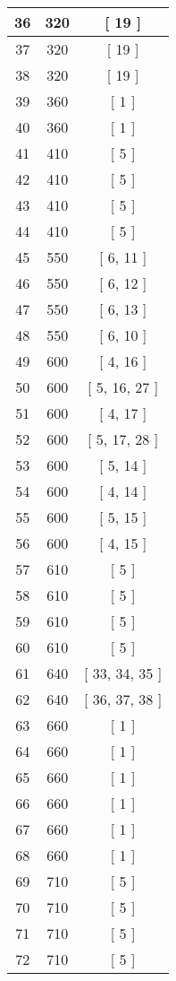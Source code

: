 \begin{center}
\begin{longtable}[H]{|| c c c ||}
\hline
36 & 320 & [ 19 ] \\ 
\hline
37 & 320 & [ 19 ] \\ 
\hline
38 & 320 & [ 19 ] \\ 
\hline
39 & 360 & [ 1 ] \\ 
\hline
40 & 360 & [ 1 ] \\ 
\hline
41 & 410 & [ 5 ] \\ 
\hline
42 & 410 & [ 5 ] \\ 
\hline
43 & 410 & [ 5 ] \\ 
\hline
44 & 410 & [ 5 ] \\ 
\hline
45 & 550 & [ 6, 11 ] \\ 
\hline
46 & 550 & [ 6, 12 ] \\ 
\hline
47 & 550 & [ 6, 13 ] \\ 
\hline
48 & 550 & [ 6, 10 ] \\ 
\hline
49 & 600 & [ 4, 16 ] \\ 
\hline
50 & 600 & [ 5, 16, 27 ] \\ 
\hline
51 & 600 & [ 4, 17 ] \\ 
\hline
52 & 600 & [ 5, 17, 28 ] \\ 
\hline
53 & 600 & [ 5, 14 ] \\ 
\hline
54 & 600 & [ 4, 14 ] \\ 
\hline
55 & 600 & [ 5, 15 ] \\ 
\hline
56 & 600 & [ 4, 15 ] \\ 
\hline
57 & 610 & [ 5 ] \\ 
\hline
58 & 610 & [ 5 ] \\ 
\hline
59 & 610 & [ 5 ] \\ 
\hline
60 & 610 & [ 5 ] \\ 
\hline
61 & 640 & [ 33, 34, 35 ] \\ 
\hline
62 & 640 & [ 36, 37, 38 ] \\ 
\hline
63 & 660 & [ 1 ] \\ 
\hline
64 & 660 & [ 1 ] \\ 
\hline
65 & 660 & [ 1 ] \\ 
\hline
66 & 660 & [ 1 ] \\ 
\hline
67 & 660 & [ 1 ] \\ 
\hline
68 & 660 & [ 1 ] \\ 
\hline
69 & 710 & [ 5 ] \\ 
\hline
70 & 710 & [ 5 ] \\ 
\hline
71 & 710 & [ 5 ] \\ 
\hline
72 & 710 & [ 5 ] \\ 
\hline

\end{longtable}
\end{center}
